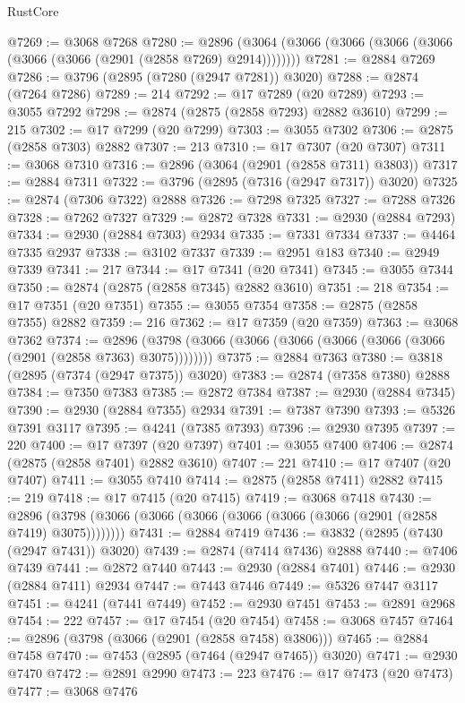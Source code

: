 \begin{lexlean}{RustCore}
\begin{coremodule}
@7269 := @3068 @7268
@7280 := @2896 (@3064 (@3066 (@3066 (@3066 (@3066 (@3066 (@3066 (@2901 (@2858 @7269) @2914))))))))
@7281 := @2884 @7269
@7286 := @3796 (@2895 (@7280 (@2947 @7281)) @3020)
@7288 := @2874 (@7264 @7286)
@7289 := 214
@7292 := @17 @7289 (@20 @7289)
@7293 := @3055 @7292
@7298 := @2874 (@2875 (@2858 @7293) @2882 @3610)
@7299 := 215
@7302 := @17 @7299 (@20 @7299)
@7303 := @3055 @7302
@7306 := @2875 (@2858 @7303) @2882
@7307 := 213
@7310 := @17 @7307 (@20 @7307)
@7311 := @3068 @7310
@7316 := @2896 (@3064 (@2901 (@2858 @7311) @3803))
@7317 := @2884 @7311
@7322 := @3796 (@2895 (@7316 (@2947 @7317)) @3020)
@7325 := @2874 (@7306 @7322) @2888
@7326 := @7298 @7325
@7327 := @7288 @7326
@7328 := @7262 @7327
@7329 := @2872 @7328
@7331 := @2930 (@2884 @7293)
@7334 := @2930 (@2884 @7303) @2934
@7335 := @7331 @7334
@7337 := @4464 @7335 @2937
@7338 := @3102 @7337
@7339 := @2951 @183
@7340 := @2949 @7339
@7341 := 217
@7344 := @17 @7341 (@20 @7341)
@7345 := @3055 @7344
@7350 := @2874 (@2875 (@2858 @7345) @2882 @3610)
@7351 := 218
@7354 := @17 @7351 (@20 @7351)
@7355 := @3055 @7354
@7358 := @2875 (@2858 @7355) @2882
@7359 := 216
@7362 := @17 @7359 (@20 @7359)
@7363 := @3068 @7362
@7374 := @2896 (@3798 (@3066 (@3066 (@3066 (@3066 (@3066 (@3066 (@2901 (@2858 @7363) @3075))))))))
@7375 := @2884 @7363
@7380 := @3818 (@2895 (@7374 (@2947 @7375)) @3020)
@7383 := @2874 (@7358 @7380) @2888
@7384 := @7350 @7383
@7385 := @2872 @7384
@7387 := @2930 (@2884 @7345)
@7390 := @2930 (@2884 @7355) @2934
@7391 := @7387 @7390
@7393 := @5326 @7391 @3117
@7395 := @4241 (@7385 @7393)
@7396 := @2930 @7395
@7397 := 220
@7400 := @17 @7397 (@20 @7397)
@7401 := @3055 @7400
@7406 := @2874 (@2875 (@2858 @7401) @2882 @3610)
@7407 := 221
@7410 := @17 @7407 (@20 @7407)
@7411 := @3055 @7410
@7414 := @2875 (@2858 @7411) @2882
@7415 := 219
@7418 := @17 @7415 (@20 @7415)
@7419 := @3068 @7418
@7430 := @2896 (@3798 (@3066 (@3066 (@3066 (@3066 (@3066 (@3066 (@2901 (@2858 @7419) @3075))))))))
@7431 := @2884 @7419
@7436 := @3832 (@2895 (@7430 (@2947 @7431)) @3020)
@7439 := @2874 (@7414 @7436) @2888
@7440 := @7406 @7439
@7441 := @2872 @7440
@7443 := @2930 (@2884 @7401)
@7446 := @2930 (@2884 @7411) @2934
@7447 := @7443 @7446
@7449 := @5326 @7447 @3117
@7451 := @4241 (@7441 @7449)
@7452 := @2930 @7451
@7453 := @2891 @2968
@7454 := 222
@7457 := @17 @7454 (@20 @7454)
@7458 := @3068 @7457
@7464 := @2896 (@3798 (@3066 (@2901 (@2858 @7458) @3806)))
@7465 := @2884 @7458
@7470 := @7453 (@2895 (@7464 (@2947 @7465)) @3020)
@7471 := @2930 @7470
@7472 := @2891 @2990
@7473 := 223
@7476 := @17 @7473 (@20 @7473)
@7477 := @3068 @7476

\end{coremodule}
\end{lexlean}
